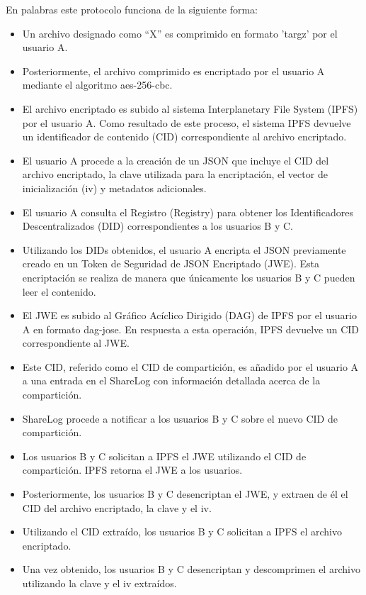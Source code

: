 En palabras este protocolo funciona de la siguiente forma:
\begin{itemize}[noitemsep,after=\vspace{-0.4\baselineskip}]
  \item Un archivo designado como ``X'' es comprimido en formato 'targz' por el usuario A.
  \item Posteriormente, el archivo comprimido es encriptado por el usuario A mediante el algoritmo aes-256-cbc.
  \item El archivo encriptado es subido al sistema Interplanetary File System (IPFS) por el usuario A. Como resultado de este proceso, el sistema IPFS devuelve un identificador de contenido (CID) correspondiente al archivo encriptado.
  \item El usuario A procede a la creación de un JSON que incluye el CID del archivo encriptado, la clave utilizada para la encriptación, el vector de inicialización (iv) y metadatos adicionales.
  \item El usuario A consulta el Registro (Registry) para obtener los Identificadores Descentralizados (DID) correspondientes a los usuarios B y C.
  \item Utilizando los DIDs obtenidos, el usuario A encripta el JSON previamente creado en un Token de Seguridad de JSON Encriptado (JWE). Esta encriptación se realiza de manera que únicamente los usuarios B y C pueden leer el contenido.
  \item El JWE es subido al Gráfico Acíclico Dirigido (DAG) de IPFS por el usuario A en formato dag-jose. En respuesta a esta operación, IPFS devuelve un CID correspondiente al JWE.
  \item Este CID, referido como el CID de compartición, es añadido por el usuario A a una entrada en el ShareLog con información detallada acerca de la compartición.
  \item ShareLog procede a notificar a los usuarios B y C sobre el nuevo CID de compartición.
  \item Los usuarios B y C solicitan a IPFS el JWE utilizando el CID de compartición. IPFS retorna el JWE a los usuarios.
  \item Posteriormente, los usuarios B y C desencriptan el JWE, y extraen de él el CID del archivo encriptado, la clave y el iv.
  \item Utilizando el CID extraído, los usuarios B y C solicitan a IPFS el archivo encriptado.
  \item Una vez obtenido, los usuarios B y C desencriptan y descomprimen el archivo utilizando la clave y el iv extraídos.
\end{itemize}

